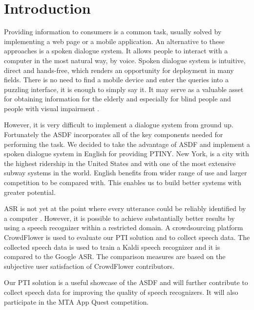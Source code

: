 

\chapter*{Introduction}

Providing information to consumers is a common task, usually solved by implementing a web page or a mobile application.
An alternative to these approaches is a spoken dialogue system.
It allows people to interact with a computer in the most natural way, by voice.
Spoken dialogue system is intuitive, direct and hands-free, which renders an opportunity for deployment in many fields.
There is no need to find a mobile device and enter the queries into a puzzling interface, it is enough to simply say it.
It may serve as a valuable asset for obtaining information for the elderly and especially for blind people and people with visual impairment \cite{blind}. %

However, it is very difficult to implement a dialogue system from ground up.
Fortunately the \acf{ASDF} \cite{asdf} incorporates all of the key components needed for performing the task.
We decided to take the advantage of \ac{ASDF} and implement a spoken dialogue system in English for providing \acf{PTINY}.
New York, is a city with the highest ridership in the United States and with one of the most extensive subway systems in the world. %
English benefits from wider range of use and larger competition to be compared with.
This enables us to build better systems with greater potential.

\acf{ASR} is not yet at the point where every utterance could be reliably identified by a computer \cite{asr}.
However, it is possible to achieve substantially better results by using a speech recognizer within a restricted domain.
A crowdsourcing platform CrowdFlower is used to evaluate our \ac{PTI} solution and to collect speech data.
The collected speech data is used to train a Kaldi speech recognizer and it is compared to the Google \ac{ASR}.
The comparison measures are based on the subjective user satisfaction of CrowdFlower contributors. %

Our \ac{PTI} solution is a useful showcase of the \ac{ASDF} and will further contribute to collect speech data for improving the quality of speech recognizers. It will also participate in the \ac{MTA} App Quest competition.

